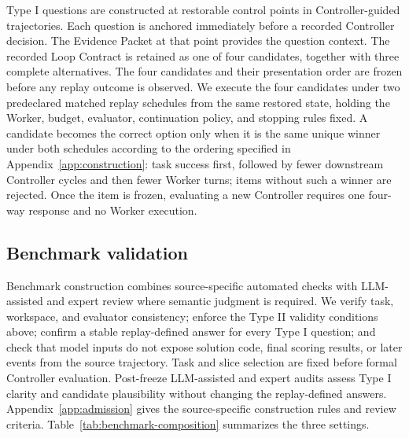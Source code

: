 Type I questions are constructed at restorable control points in Controller-guided trajectories. Each question is anchored immediately before a recorded Controller decision. The Evidence Packet at that point provides the question context. The recorded Loop Contract is retained as one of four candidates, together with three complete alternatives. The four candidates and their presentation order are frozen before any replay outcome is observed.
We execute the four candidates under two predeclared matched replay schedules from the same restored state, holding the Worker, budget, evaluator, continuation policy, and stopping rules fixed. A candidate becomes the correct option only when it is the same unique winner under both schedules according to the ordering specified in Appendix~\ref{app:construction}: task success first, followed by fewer downstream Controller cycles and then fewer Worker turns; items without such a winner are rejected. Once the item is frozen, evaluating a new Controller requires one four-way response and no Worker execution.

\subsection{Benchmark validation}
\label{sec:admission}

Benchmark construction combines source-specific automated checks with LLM-assisted and expert review where semantic judgment is required. We verify task, workspace, and evaluator consistency; enforce the Type II validity conditions above; confirm a stable replay-defined answer for every Type I question; and check that model inputs do not expose solution code, final scoring results, or later events from the source trajectory. Task and slice selection are fixed before formal Controller evaluation. Post-freeze LLM-assisted and expert audits assess Type I clarity and candidate plausibility without changing the replay-defined answers. Appendix~\ref{app:admission} gives the source-specific construction rules and review criteria.
Table~\ref{tab:benchmark-composition} summarizes the three settings.

